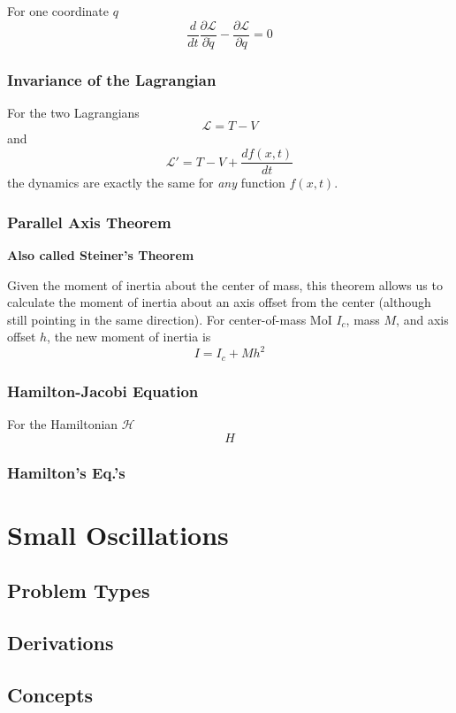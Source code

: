 \documentclass[25pt]{book}
\begin{document}
	For one coordinate $q$
	\[
	\frac{d}{dt} \frac{\partial \mathcal{L}}{\partial \dot{q}} - \frac{\partial \mathcal{L}}{\partial q}= 0
	\]
	
	\subsection{Invariance of the Lagrangian}
	
	For the two Lagrangians 
	\[
	\mathcal{L} = T - V
	\]
	and 
	\[
	\mathcal{L}' = T - V + \frac{d f(x,t)}{dt}
	\]
	the dynamics are exactly the same for \textit{any} function $f(x,t)$. 
	
	\subsection{Parallel Axis Theorem}
	\textbf{Also called Steiner's Theorem}
	
	Given the moment of inertia about the center of mass, this theorem allows us to calculate the moment of inertia about an axis offset from the center (although still pointing in the same direction). For center-of-mass MoI $I_c$, mass $M$, and axis offset $h$, the new moment of inertia is
	\[
	I = I_c + Mh^2
	\]
	
	\subsection{Hamilton-Jacobi Equation}
	
	For the Hamiltonian $\mathcal{H}$
	\[
	H
	\]
	
	\subsection{Hamilton's Eq.'s}
	
	\chapter{Small Oscillations}
	
	\section{Problem Types}
	
	\section{Derivations}
	
	\section{Concepts}
	
\end{document}
